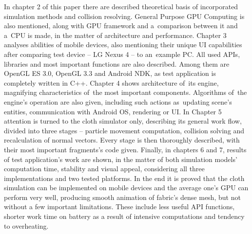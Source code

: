 In chapter 2 of this paper there are described theoretical basis of incorporated simulation methods and collision resolving. General Purpose GPU Computing is also mentioned, along with GPU framework and a~comparison between it and a~CPU is made, in the matter of architecture and performance. Chapter 3 analyses abilities of mobile devices, also mentioning their unique UI capabilities after comparing test device -- LG Nexus 4 -- to an~example PC. All used APIs, libraries and most important functions are also described. Among them are OpenGL ES 3.0, OpenGL 3.3 and Android NDK, as test application is completely written in C++. Chapter 4 shows architecture of~its engine, magnifying characteristics of~the most important components. Algorithms of~the engine's operation are also given, including such actions as~updating scene's entities, communication with Android OS, rendering or UI. In Chapter 5 attention is turned to the cloth simulator only, describing its general work flow, divided into three stages -- particle movement computation, collision solving and recalculation of normal vectors. Every stage is then thoroughly described, with their most important fragments's code given. Finally, in chapters 6 and 7, results of test application's work are shown, in the matter of both simulation models' computation time, stability and visual appeal, considering all three implementations and two tested platforms. In the end it is proved that the cloth simulation can be implemented on mobile devices and the average one's GPU can perform very well, producing smooth animation of fabric's dense mesh, but not without a few important limitations. These include less useful API functions, shorter work time on battery as a result of intensive computations and tendency to overheating.
